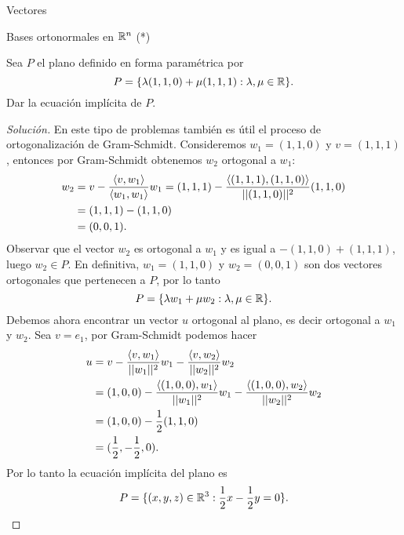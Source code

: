\begin{chapter}{Vectores}
\begin{section}{Bases ortonormales en $\mathbb R^n$ (*)}
\begin{ejemplo*}
    Sea $P$ el plano definido en forma paramétrica por 
    \begin{equation*}
        P = \{\lambda(1,1,0) + \mu(1,1,1): \lambda, \mu \in \mathbb R\}.
    \end{equation*}
    Dar la ecuación implícita de $P$.
\end{ejemplo*}
\begin{proof}[Solución]
    En  este tipo de problemas también es útil el proceso de ortogonalización de Gram-Schmidt. Consideremos $w_1 = (1,1,0)$ y $v =(1,1,1)$,  entonces por Gram-Schmidt obtenemos $w_2$ ortogonal a $w_1$:
    \begin{align*}
        w_2 &= v - \frac{\langle v,w_1\rangle}{\langle w_1,w_1\rangle}w_1  = (1,1,1) - \frac{\langle (1,1,1),(1,1,0)\rangle}{||(1,1,0)||^2}(1,1,0) \\
        &=  (1,1,1) - (1,1,0) \\
        &=(0,0,1).
    \end{align*}
    Observar que el vector $w_2$ es ortogonal a $w_1$ y  es igual a  $ - (1,1,0) + (1,1,1)$, luego $w_2 \in P$. En definitiva, $w_1 = (1,1,0)$ y $w_2=(0,0,1)$ son dos vectores ortogonales que pertenecen a $P$, por lo tanto 
    \begin{equation*}
        P = \{\lambda w_1 + \mu w_2: \lambda, \mu \in \mathbb R\}.
    \end{equation*}
    Debemos ahora encontrar un vector $u$ ortogonal al plano,  es decir ortogonal a $w_1$ y $w_2$. Sea $v =e_1$, por Gram-Schmidt podemos hacer
    \begin{align*}
        u&= v - \frac{\langle v,w_1\rangle}{||w_1||^2}w_1- \frac{\langle v,w_2\rangle}{||w_2||^2}w_2 \\
        &= (1,0,0) - \frac{\langle (1,0,0),w_1\rangle}{||w_1||^2}w_1- \frac{\langle (1,0,0), w_2\rangle}{||w_2||^2} w_2\\
        &= (1,0,0) - \frac{1}{2}(1,1,0)  \\
        &= (\frac{1}{2},-\frac{1}{2},0).
       \end{align*}
      Por lo tanto  la ecuación implícita del plano es
      \begin{equation*}
        P = \{(x,y,z)\in \mathbb R^3: \frac{1}{2}x-\frac{1}{2}y =0\}.
      \end{equation*}
\end{proof}

\end{section}

\end{chapter}
